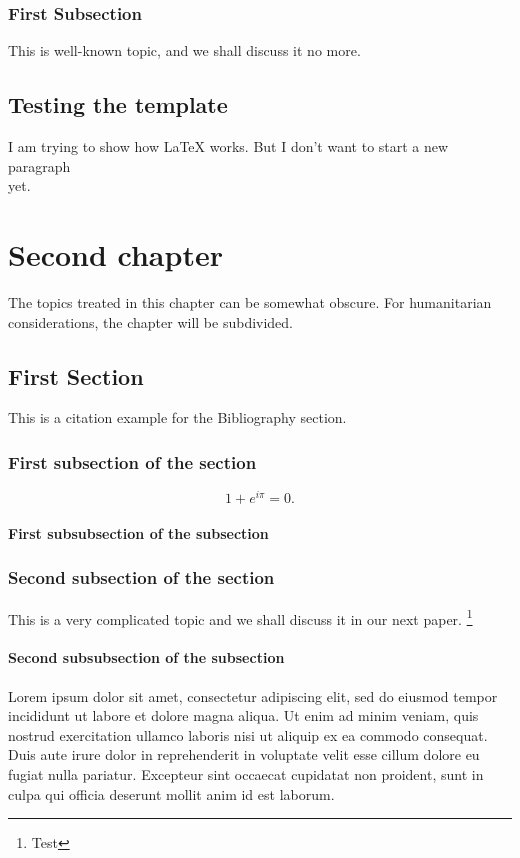 \documentclass[hidelinks,pdftex,phd]{pittetd}
\begin{document}
\subsection{First Subsection}
This is well-known topic, and we shall discuss it no more.
\section{Testing the template}
I am trying to show how LaTeX works.
But I don't want to start a new paragraph \\ yet.
\cite{DUMMY:1}


\chapter{Second chapter}
The topics treated in this chapter can be somewhat obscure. For humanitarian considerations, the chapter will be subdivided.
\section{First Section}
This is a citation example for the Bibliography section.\cite{DUMMY:2}


\subsection{First subsection of the section}

\begin{equation} \label{EQ1}
     1 + e^{i \pi} = 0.
\end{equation}
\subsubsection{First subsubsection of the subsection}
\subsection{Second subsection of the section}
This is a very complicated topic and we shall discuss it in our next paper.\cite{DUMMY:11}
\footnote{Test}
\subsubsection{Second subsubsection of the subsection}
Lorem ipsum dolor sit amet, consectetur adipiscing elit, sed do eiusmod tempor incididunt ut labore et dolore magna aliqua.\cite{DUMMY:3} Ut enim ad minim veniam, quis nostrud exercitation ullamco laboris nisi ut aliquip ex ea commodo consequat. Duis aute irure dolor in reprehenderit in voluptate velit esse cillum dolore eu fugiat nulla pariatur.\cite{DUMMY:4} Excepteur sint occaecat cupidatat non proident, sunt in culpa qui officia deserunt mollit anim id est laborum.\cite{DUMMY:5}
\end{document}
